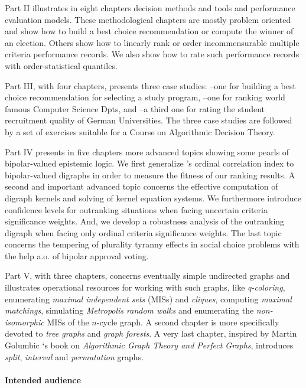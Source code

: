 Part II illustrates in eight chapters decision methods and tools and performance evaluation models. These methodological chapters are mostly problem oriented and show how to build a best choice recommendation or compute the winner of an election. Others show how to linearly rank or order incommensurable multiple criteria performance records. We also show how to rate such performance records with order-statistical quantiles.

Part III, with four chapters, presents three case studies: --one for building a best choice recommendation for selecting a study program, --one for ranking world famous Computer Science Dpts, and --a third one for rating the student recruitment quality of German Universities. The three case studies are followed by a set of exercises suitable for a Course on Algorithmic Decision Theory.

Part IV presents in five chapters more advanced topics showing some pearls of bipolar-valued epistemic logic. We first generalize \Kendall 's ordinal correlation index to bipolar-valued digraphs in order to measure the fitness of our ranking results. A second and important advanced topic concerns the effective computation of digraph kernels and solving of \Berge kernel equation systems. We furthermore introduce confidence levels for outranking situations when facing uncertain criteria significance weights. And, we develop a robustness analysis of the outranking digraph when facing only ordinal criteria significance weights. The last topic concerns the tempering of plurality tyranny effects in social choice problems with the help a.o. of bipolar approval voting. 

Part V, with three chapters, concerns eventually simple undirected graphs and illustrates operational resources for working with such graphs, like \emph{q-coloring}, enumerating\emph{ maximal independent sets} (MISs) and \emph{cliques}, computing \emph{maximal matchings}, simulating \emph{Metropolis random walks} and enumerating the \emph{non-isomorphic} MISs of the $n$-cycle graph. A second chapter is more specifically devoted to \emph{tree graphs} and \emph{graph forests}. A very last chapter, inspired by Martin Golumbic ‘s book on \emph{Algorithmic Graph Theory and Perfect Graphs}, introduces \emph{split}, \emph{interval} and \emph{permutation} graphs.

\paragraph{Intended audience}

